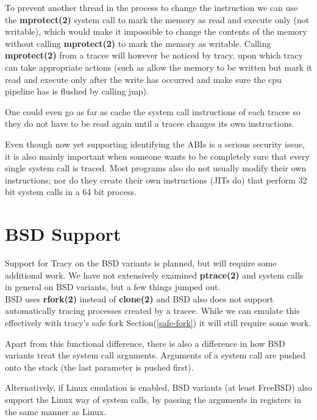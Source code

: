 \documentclass[a4paper, 10pt]{report}
\begin{document}
To prevent another thread in the process to change the instruction we can
use the \textbf{mprotect(2)} system call to mark the memory as read and execute
only (not writable), which would make it impossible to change the contents of
the memory without calling \textbf{mprotect(2)} to mark the memory as writable.
Calling \textbf{mprotect(2)} from a tracee will however be noticed by tracy,
upon which tracy can take appropriate actions (such as allow the memory to be
written but mark it read and execute only after the write has occurred and make
sure the cpu pipeline has is flushed by calling jmp).

One could even go as far as cache the system call instructions of each tracee
so they do not have to be read again until a tracee changes its own
instructions.

Even though now yet supporting identifying the ABIs is a serious security issue,
it is also mainly important when someone wants to be completely sure that every
single system call is traced. Most programs also do not usually modify their
own instructions; nor do they create their own instructions (JITs do)
that perform 32 bit system calls in a 64 bit process.

\section{BSD Support}

Support for Tracy on the BSD variants is planned, but will require some
additional work. We have not extensively examined \textbf{ptrace(2)} and
system calls in general on BSD variants, but a few things jumped out. \\

BSD uses \textbf{rfork(2)} instead of \textbf{clone(2)} and BSD also does
not support automatically tracing processes created by a tracee. While
we can emulate this effectively with tracy's safe fork
Section(\ref{safe-fork}) it will still require some work.

Apart from this functional difference, there is also a difference in
how BSD variants treat the system call arguments. Arguments of a system
call are pushed onto the stack (the last parameter is pushed first).
\cite{int80h}

Alternatively, if Linux emulation is enabled, BSD variants (at least FreeBSD)
also support the Linux way of system calls, by passing the arguments in
registers in the same manner as Linux.
\end{document}
